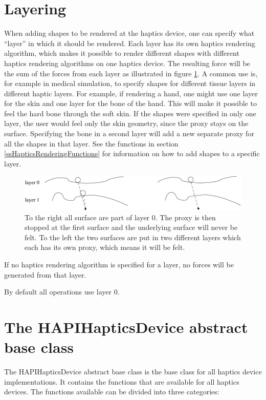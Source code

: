 \section{Layering}
When adding shapes to be rendered at the haptics device, one can
specify what ``layer'' in which it should be rendered. Each layer has
its own haptics rendering algorithm, which makes it possible to render
different shapes with different haptics rendering algorithms on one
haptics device. The resulting force will be the sum of the forces from
each layer as illustrated in figure \ref{Layering_fig}. A common use is,
for example in medical simulation, to
specify shapes for different tissue layers in different haptic
layers. For example, if rendering a hand, one might use one layer for
the skin and one layer for the bone of the hand. This will make it
possible to feel the hard bone through the soft skin. If the shapes
were specified in only one layer, the user would feel only the skin
geometry, since the proxy stays on the surface. Specifying the bone in
a second layer will add a new separate proxy for all the shapes in
that layer. See the functions in section \ref{ssHapticsRenderingFunctions} for
information on how to add shapes to a specific layer.

\begin{figure} 
  \centering 
  \includegraphics{images/layering2.pdf}
  \caption{To the right all surface are part of layer 0. The proxy is then stopped at the first surface and the
underlying surface will never be felt. To the left the two surfaces are put in two different layers which
each has its own proxy, which means it will be felt.} 
  \label{Layering_fig} 
\end{figure}

If no haptics rendering algorithm is specified for a layer, no forces
will be generated from that layer.
 
By default all operations use layer 0.

\section{The HAPIHapticsDevice abstract base class}
The HAPIHapticsDevice abstract base class is the base class for all
haptics device implementations. It contains the functions that are
available for all haptics devices.  The functions available can be divided into three categories:

